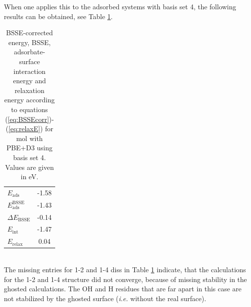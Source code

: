 \documentclass[11pt,DIV=13,BCOR=5mm,a4paper,headinclude]{scrbook}
\begin{document}
When one applies this to the adsorbed systems with basis set 4, the following results can be obtained, see Table \ref{tab:bsse-results}.
\begin{table}[!h]
  \centering
   \caption{BSSE-corrected energy, BSSE, adsorbate-surface interaction energy and relaxation energy according to equations (\ref{eq:BSSEcorr})-(\ref{eq:relaxE}) for mol with PBE+D3 using basis set 4.
Values are given in eV.}
  \begin{tabular}{l|c}
  \toprule
$E_\textrm{ads}$	&-1.58 \\
$E_\textrm{ads}^\textrm{BSSE}$&-1.43\\ %
$\Delta E_\textrm{BSSE}$&-0.14\\%
$E_\textrm{int}$	&-1.47\\ %
$E_\textrm{relax}$	&0.04 \\\bottomrule%
  \end{tabular}
  \label{tab:bsse-results}
 \end{table}
 \\
 
The missing entries for 1-2 and 1-4 diss in Table \ref{tab:bsse-results} indicate, that the calculations for the 1-2 and 1-4 structure did not converge, because of missing stability in the ghosted calculations.
The OH and H residues that are far apart in this case are not stabilized by the ghosted surface (\textit{i.e.} without the real surface).
\end{document}

